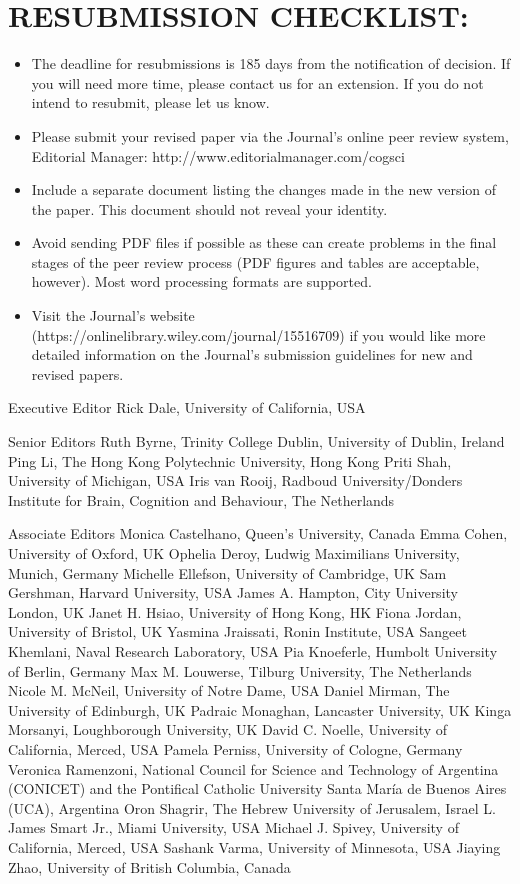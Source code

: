 \documentclass[a4paper]{article}
\begin{document}
\section{RESUBMISSION CHECKLIST:}

\begin{itemize}
\item  The deadline for resubmissions is 185 days from the notification of decision. If you will need more time, please contact us for an extension. If you do not intend to resubmit, please let us know.

\item Please submit your revised paper via the Journal's online peer review system, Editorial Manager: http://www.editorialmanager.com/cogsci

\item Include a separate document listing the changes made in the new version of the paper. This document should not reveal your identity.

\item Avoid sending PDF files if possible as these can create problems in the final stages of the peer review process (PDF figures and tables are acceptable, however). Most word processing formats are supported.

\item Visit the Journal's website (https://onlinelibrary.wiley.com/journal/15516709) if you would like more detailed information on the Journal's submission guidelines for new and revised papers.
\end{itemize}

Executive Editor
Rick Dale, University of California, USA

Senior Editors
Ruth Byrne, Trinity College Dublin, University of Dublin, Ireland
Ping Li, The Hong Kong Polytechnic University, Hong Kong
Priti Shah, University of Michigan, USA
Iris van Rooij, Radboud University/Donders Institute for Brain, Cognition and Behaviour, The Netherlands

Associate Editors
Monica Castelhano, Queen's University, Canada
Emma Cohen, University of Oxford, UK
Ophelia Deroy, Ludwig Maximilians University, Munich, Germany
Michelle Ellefson, University of Cambridge, UK
Sam Gershman, Harvard University, USA
James A. Hampton, City University London, UK
Janet H. Hsiao, University of Hong Kong, HK
Fiona Jordan, University of Bristol, UK
Yasmina Jraissati, Ronin Institute, USA
Sangeet Khemlani, Naval Research Laboratory, USA
Pia Knoeferle, Humbolt University of Berlin, Germany
Max M. Louwerse, Tilburg University, The Netherlands
Nicole M. McNeil, University of Notre Dame, USA
Daniel Mirman, The University of Edinburgh, UK
Padraic Monaghan, Lancaster University, UK
Kinga Morsanyi, Loughborough University, UK
David C. Noelle, University of California, Merced, USA
Pamela Perniss, University of Cologne, Germany
Veronica Ramenzoni, National Council for Science and Technology of Argentina (CONICET) and the Pontifical Catholic University Santa María de Buenos Aires (UCA), Argentina
Oron Shagrir, The Hebrew University of Jerusalem, Israel
L. James Smart Jr., Miami University, USA
Michael J. Spivey, University of California, Merced, USA
Sashank Varma, University of Minnesota, USA
Jiaying Zhao, University of British Columbia, Canada
\end{document}
